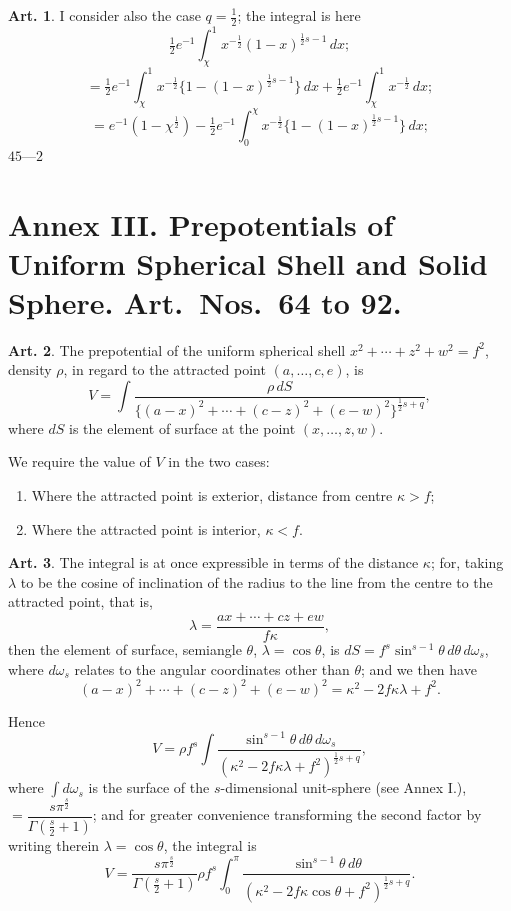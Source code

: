 \documentclass[12pt,a4paper]{article}
\theoremstyle{definition}
\newtheorem{art}{Art.}[section]
\begin{document}
\begin{art}\label{art:59}
I consider also the case $q = \tfrac{1}{2}$; the integral is here
\[
\tfrac{1}{2}e^{-1} \int_\chi^1 x^{-\frac{1}{2}}(1-x)^{\frac{1}{2}s-1}\, dx;
\]
\[
= \tfrac{1}{2}e^{-1} \int_\chi^1 x^{-\frac{1}{2}}\{1-(1-x)^{\frac{1}{2}s-1}\}\, dx + \tfrac{1}{2}e^{-1}\int_\chi^1 x^{-\frac{1}{2}}\, dx;
\]
\[
= e^{-1}(1-\chi^{\frac{1}{2}}) - \tfrac{1}{2}e^{-1}\int_0^\chi x^{-\frac{1}{2}}\{1-(1-x)^{\frac{1}{2}s-1}\}\, dx;
\]
$45$---$2$
\end{art}

\newpage
\section*{Annex III. Prepotentials of Uniform Spherical Shell and Solid Sphere. Art.\ Nos.\ 64 to 92.}

\begin{art}\label{art:60}
The prepotential of the uniform spherical shell $x^2 + \cdots + z^2 + w^2 = f^2$, density $\rho$, in regard to the attracted point $(a, \ldots, c, e)$, is
\[
V = \int \frac{\rho \, dS}{\{(a-x)^2 + \cdots + (c-z)^2 + (e-w)^2\}^{\frac{1}{2}s+q}},
\]
where $dS$ is the element of surface at the point $(x, \ldots, z, w)$.

We require the value of $V$ in the two cases:
\begin{enumerate}[label=\arabic*.]
\item Where the attracted point is exterior, distance from centre $\kappa > f$;
\item Where the attracted point is interior, $\kappa < f$.
\end{enumerate}
\end{art}

\begin{art}\label{art:61}
The integral is at once expressible in terms of the distance $\kappa$; for, taking $\lambda$ to be the cosine of inclination of the radius to the line from the centre to the attracted point, that is,
\[
\lambda = \frac{ax + \cdots + cz + ew}{f\kappa},
\]
then the element of surface, semiangle $\theta$, $\lambda = \cos\theta$, is $dS = f^s \sin^{s-1}\theta \, d\theta \, d\omega_s$, where $d\omega_s$ relates to the angular coordinates other than $\theta$; and we then have
\[
(a-x)^2 + \cdots + (c-z)^2 + (e-w)^2 = \kappa^2 - 2f\kappa\lambda + f^2.
\]

Hence
\[
V = \rho f^s \int \frac{\sin^{s-1}\theta \, d\theta \, d\omega_s}{(\kappa^2 - 2f\kappa\lambda + f^2)^{\frac{1}{2}s+q}},
\]
where $\int d\omega_s$ is the surface of the $s$-dimensional unit-sphere (see Annex I.), $= \dfrac{s\pi^{\frac{s}{2}}}{\Gamma(\frac{s}{2}+1)}$; and for greater convenience transforming the second factor by writing therein $\lambda = \cos\theta$, the integral is
\[
V = \frac{s\pi^{\frac{s}{2}}}{\Gamma(\frac{s}{2}+1)} \rho f^s \int_0^\pi \frac{\sin^{s-1}\theta \, d\theta}{(\kappa^2 - 2f\kappa\cos\theta + f^2)^{\frac{1}{2}s+q}}.
\]
\end{art}
\end{document}
